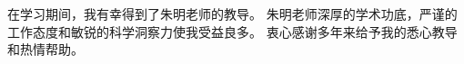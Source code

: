 
\begin{acknowledgements}

在学习期间，我有幸得到了朱明老师的教导。
朱明老师深厚的学术功底，严谨的工作态度和敏锐的科学洞察力使我受益良多。
衷心感谢多年来给予我的悉心教导和热情帮助。

\end{acknowledgements}
